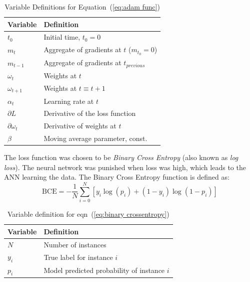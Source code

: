 \documentclass{mcmthesis}
\begin{document}
\begin{table}[H]
\caption{Variable Definitions for Equation~(\ref{eq:adam func})}
\centering
\begin{tabularx}{\textwidth} {
  >{\raggedright\arraybackslash}X 
  >{\raggedright\arraybackslash}X  }
 \hline
 \textbf{Variable} & \textbf{Definition} \\
 \hline\hline
  $t_0$ & Initial time, $t_0 = 0$ \\
 $m_t$ & Aggregate of gradients at $t$ ($m_{t_0}=0$) \\
 $m_{t-1}$ & Aggregate of gradients at $t_{previous}$ \\
 $\omega_{t}$ & Weights at $t$ \\ 
 $\omega_{t+1}$ & Weights at $t\equiv t+1$ \\ 
 $\alpha_t$ & Learning rate at $t$ \\ 
 $\partial L$ & Derivative of the loss function \\ 
 $\partial \omega_t$ & Derivative of weights at $t$ \\
 $\beta$ & Moving average parameter, const. \\
 \hline
\end{tabularx}
\end{table}

The loss function was chosen to be \textit{Binary Cross Entropy} (also known as \textit{log loss}). The neural network was punished when loss was high, which leads to the ANN learning the data. The Binary Cross Entropy function is defined as:
\begin{equation}\label{eq:binary crossentropy}
    \text{BCE} = -\frac{1}{N}\sum_{i=0}^{N}\left [y_i \log(p_i) +(1-y_i)\log(1-p_i)\right]
\end{equation}

\begin{table}[H]
\caption{Variable definition for eqn~(\ref{eq:binary crossentropy})}
\centering
\vspace{5pt}
\begin{tabularx}{\textwidth} {
  >{\raggedright\arraybackslash}X 
  >{\raggedright\arraybackslash}X  }
 \hline
 \textbf{Variable} & \textbf{Definition} \\
 \hline\hline
  $N$ & Number of instances \\
  $y_i$ & True label for instance $i$ \\
 $p_i$ & Model predicted probability of instance $i$ \\ \hline
 \end{tabularx}
\end{table}
\end{document}
